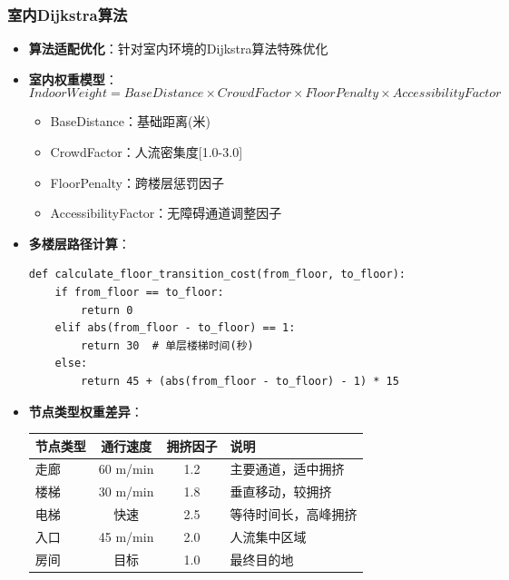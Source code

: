 \documentclass[12pt,a4paper]{article}
\begin{document}
\subsubsection{室内Dijkstra算法}
\begin{itemize}
    \item \textbf{算法适配优化}：针对室内环境的Dijkstra算法特殊优化
    \item \textbf{室内权重模型}：
    \[IndoorWeight = BaseDistance \times CrowdFactor \times FloorPenalty \times AccessibilityFactor\]
    \begin{itemize}
        \item BaseDistance：基础距离(米)
        \item CrowdFactor：人流密集度[1.0-3.0]
        \item FloorPenalty：跨楼层惩罚因子
        \item AccessibilityFactor：无障碍通道调整因子
    \end{itemize}
    \item \textbf{多楼层路径计算}：
    \begin{verbatim}
def calculate_floor_transition_cost(from_floor, to_floor):
    if from_floor == to_floor:
        return 0
    elif abs(from_floor - to_floor) == 1:
        return 30  # 单层楼梯时间(秒)
    else:
        return 45 + (abs(from_floor - to_floor) - 1) * 15
    \end{verbatim}
    \item \textbf{节点类型权重差异}：
    \begin{center}
    \begin{tabular}{|l|c|c|l|}
    \hline
    \textbf{节点类型} & \textbf{通行速度} & \textbf{拥挤因子} & \textbf{说明} \\
    \hline
    走廊 & 60 m/min & 1.2 & 主要通道，适中拥挤 \\
    楼梯 & 30 m/min & 1.8 & 垂直移动，较拥挤 \\
    电梯 & 快速 & 2.5 & 等待时间长，高峰拥挤 \\
    入口 & 45 m/min & 2.0 & 人流集中区域 \\
    房间 & 目标 & 1.0 & 最终目的地 \\
    \hline
    \end{tabular}
    \end{center}
\end{itemize}
\end{document}
